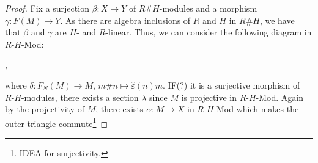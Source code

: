 \documentclass{amsart}
\theoremstyle{definition}
\begin{document}
\begin{proof}
		Fix a surjection $\beta: X \rightarrow Y$ of $R\#H$-modules and a morphism  $\gamma: F(M) \rightarrow Y$. As there are algebra inclusions of $R$ and $H$ in  $R\#H$, we have that $\beta$ and $\gamma$ are $H$- and $R$-linear.
		Thus, we can consider the following diagram in $R$-$H$-Mod:		
		\begin{center}
			,
		\end{center}
		where  $\delta: F_N(M) \rightarrow M$, $m \#  n \mapsto 
		\widehat \varepsilon (n)  m$. 
		IF(?) it is a surjective morphism of $R\text{-}H$-modules, there exists a section $\lambda$ since $M$ is projective in $R$-$H$-Mod.  Again by the projectivity of $M$, there exists $\alpha \colon M \to X$ in $R$-$H$-Mod which makes the outer triangle commute\footnote{
			IDEA for surjectivity.
			
}
\end{proof}
\end{document}
